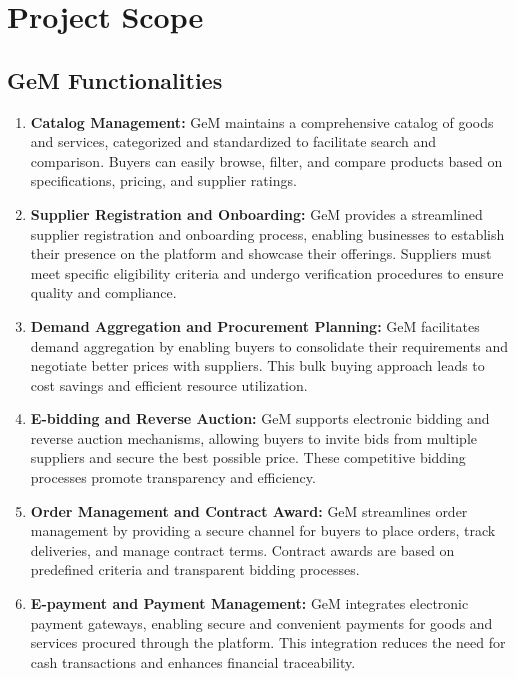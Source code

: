 \section{Project Scope}
\subsection{GeM Functionalities}

\begin{enumerate}
    \item \textbf{Catalog Management:} GeM maintains a comprehensive catalog of goods and services, categorized and standardized to facilitate search and comparison. Buyers can easily browse, filter, and compare products based on specifications, pricing, and supplier ratings.
    
    \item \textbf{Supplier Registration and Onboarding:} GeM provides a streamlined supplier registration and onboarding process, enabling businesses to establish their presence on the platform and showcase their offerings. Suppliers must meet specific eligibility criteria and undergo verification procedures to ensure quality and compliance.
    
    \item \textbf{Demand Aggregation and Procurement Planning:} GeM facilitates demand aggregation by enabling buyers to consolidate their requirements and negotiate better prices with suppliers. This bulk buying approach leads to cost savings and efficient resource utilization.
    
    \item \textbf{E-bidding and Reverse Auction:} GeM supports electronic bidding and reverse auction mechanisms, allowing buyers to invite bids from multiple suppliers and secure the best possible price. These competitive bidding processes promote transparency and efficiency.
    
    \item \textbf{Order Management and Contract Award:} GeM streamlines order management by providing a secure channel for buyers to place orders, track deliveries, and manage contract terms. Contract awards are based on predefined criteria and transparent bidding processes.
    
    \item \textbf{E-payment and Payment Management:} GeM integrates electronic payment gateways, enabling secure and convenient payments for goods and services procured through the platform. This integration reduces the need for cash transactions and enhances financial traceability.
    

\end{enumerate}
